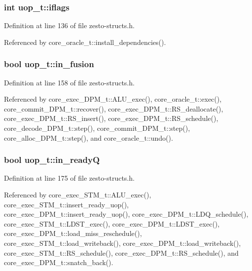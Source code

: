\subsubsection[{iflags}]{\setlength{\rightskip}{0pt plus 5cm}int {\bf uop\_\-t::iflags}}\label{structuop__t_dd3e91d0ee510873faf7b091da66ff14}




Definition at line 136 of file zesto-structs.h.

Referenced by core\_\-oracle\_\-t::install\_\-dependencies().
\subsubsection[{in\_\-fusion}]{\setlength{\rightskip}{0pt plus 5cm}bool {\bf uop\_\-t::in\_\-fusion}}\label{structuop__t_831dde25d8ef14de7a0c73bc3a5fa3c9}




Definition at line 158 of file zesto-structs.h.

Referenced by core\_\-exec\_\-DPM\_\-t::ALU\_\-exec(), core\_\-oracle\_\-t::exec(), core\_\-commit\_\-DPM\_\-t::recover(), core\_\-exec\_\-DPM\_\-t::RS\_\-deallocate(), core\_\-exec\_\-DPM\_\-t::RS\_\-insert(), core\_\-exec\_\-DPM\_\-t::RS\_\-schedule(), core\_\-decode\_\-DPM\_\-t::step(), core\_\-commit\_\-DPM\_\-t::step(), core\_\-alloc\_\-DPM\_\-t::step(), and core\_\-oracle\_\-t::undo().
\subsubsection[{in\_\-readyQ}]{\setlength{\rightskip}{0pt plus 5cm}bool {\bf uop\_\-t::in\_\-readyQ}}\label{structuop__t_e9795695e79fbfbcdaa52b622a768e1e}




Definition at line 175 of file zesto-structs.h.

Referenced by core\_\-exec\_\-STM\_\-t::ALU\_\-exec(), core\_\-exec\_\-STM\_\-t::insert\_\-ready\_\-uop(), core\_\-exec\_\-DPM\_\-t::insert\_\-ready\_\-uop(), core\_\-exec\_\-DPM\_\-t::LDQ\_\-schedule(), core\_\-exec\_\-STM\_\-t::LDST\_\-exec(), core\_\-exec\_\-DPM\_\-t::LDST\_\-exec(), core\_\-exec\_\-DPM\_\-t::load\_\-miss\_\-reschedule(), core\_\-exec\_\-STM\_\-t::load\_\-writeback(), core\_\-exec\_\-DPM\_\-t::load\_\-writeback(), core\_\-exec\_\-STM\_\-t::RS\_\-schedule(), core\_\-exec\_\-DPM\_\-t::RS\_\-schedule(), and core\_\-exec\_\-DPM\_\-t::snatch\_\-back().
